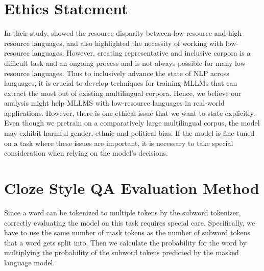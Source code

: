 \documentclass[11pt]{article}
\begin{document}
\section*{Ethics Statement}
In their study, \citet{joshi-etal-2020-state} showed the resource disparity between low-resource and high-resource languages, and \citep{ruder2020beyondenglish} also highlighted the necessity of working with low-resource languages. However, creating representative and inclusive corpora is a difficult task and an ongoing process and is not always possible for many low-resource languages. Thus to inclusively advance the state of NLP across languages, it is crucial to develop techniques for training MLLMs that can extract the most out of existing multilingual corpora. Hence, we believe our analysis might help MLLMS with low-resource languages in real-world applications. However, there is one ethical issue that we want to state explicitly. Even though we pretrain on a comparatively large multilingual corpus, the model may exhibit harmful gender, ethnic and political bias. If the model is fine-tuned on a task where these issues are important, it is necessary to take special consideration when relying on the model's decisions.



\appendix
\section{Cloze Style QA Evaluation Method}
\label{sec:csqa-eval-isse}
Since a word can be tokenized to multiple tokens by the subword tokenizer, correctly evaluating the model on this task requires special care. Specifically, we have to use the same number of mask tokens as the number of subword tokens that a word gets split into. Then we calculate the probability for the word by multiplying the probability of the subword tokens  predicted by the masked language model. 
\end{document}
